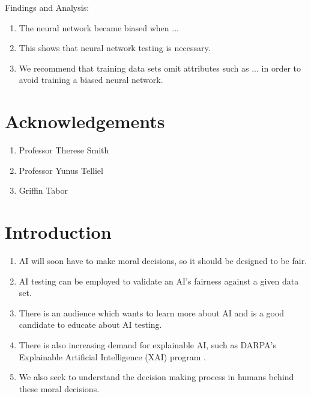 \documentclass{report}
\begin{document}
Findings and Analysis:
\begin{enumerate}
    \item The neural network became biased when ...
    
    \item This shows that neural network testing is necessary.
    
    \item We recommend that training data sets omit attributes such as ... in order to avoid
    training a biased neural network.
\end{enumerate}

\chapter*{Acknowledgements}

\begin{enumerate}
    \item Professor Therese Smith
    \item Professor Yunus Telliel
    \item Griffin Tabor
\end{enumerate}

\tableofcontents

\chapter{Introduction}

\begin{enumerate}
    \item AI will soon have to make moral decisions, so it should be designed to be fair.
    
    \item AI testing can be employed to validate an AI's fairness against a given data set.
    
    \item There is an audience which wants to learn more about AI and is a good candidate to educate
    about AI testing.
    
    \item There is also increasing demand for explainable AI, such as DARPA's Explainable Artificial
    Intelligence (XAI) program \cite{gunning2016explainable}.
    
    \item We also seek to understand the decision making process in humans behind these moral
    decisions.
\end{enumerate}
\end{document}
